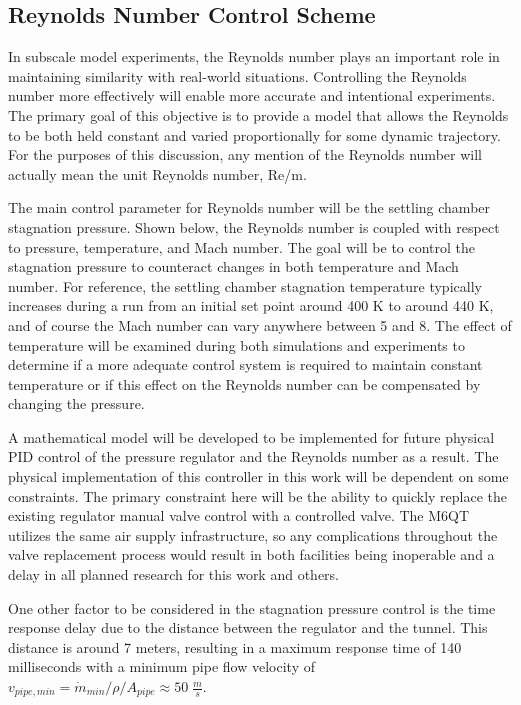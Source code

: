 \subsection{Reynolds Number Control Scheme}

In subscale model experiments, the Reynolds number plays an important role in maintaining similarity with real-world situations. Controlling the Reynolds number more effectively will enable more accurate and intentional experiments. The primary goal of this objective is to provide a model that allows the Reynolds to be both held constant and varied proportionally for some dynamic trajectory. For the purposes of this discussion, any mention of the Reynolds number will actually mean the unit Reynolds number, Re/m.

The main control parameter for Reynolds number will be the settling chamber stagnation pressure. Shown below, the Reynolds number is coupled with respect to pressure, temperature, and Mach number. The goal will be to control the stagnation pressure to counteract changes in both temperature and Mach number. For reference, the settling chamber stagnation temperature typically increases during a run from an initial set point around 400 K to around 440 K, and of course the Mach number can vary anywhere between 5 and 8. The effect of temperature will be examined during both simulations and experiments to determine if a more adequate control system is required to maintain constant temperature or if this effect on the Reynolds number can be compensated by changing the pressure.

A mathematical model will be developed to be implemented for future physical PID control of the pressure regulator and the Reynolds number as a result. The physical implementation of this controller in this work will be dependent on some constraints. The primary constraint here will be the ability to quickly replace the existing regulator manual valve control with a controlled valve. The M6QT utilizes the same air supply infrastructure, so any complications throughout the valve replacement process would result in both facilities being inoperable and a delay in all planned research for this work and others.

One other factor to be considered in the stagnation pressure control is the time response delay due to the distance between the regulator and the tunnel. This distance is around 7 meters, resulting in a maximum response time of 140 milliseconds with a minimum pipe flow velocity of $v_{pipe,min} = \dot{m}_{min}/\rho/A_{pipe} \approx 50 \; \frac{m}{s}$.


